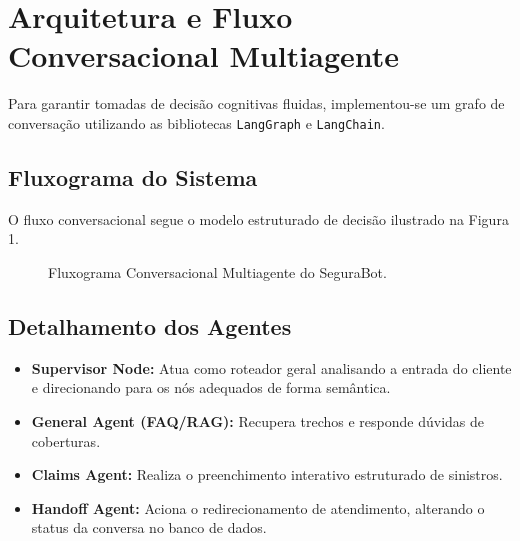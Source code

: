 \documentclass[12pt,a4paper]{article}
\begin{document}
\newpage

\section{Arquitetura e Fluxo Conversacional Multiagente}
Para garantir tomadas de decisão cognitivas fluidas, implementou-se um grafo de conversação utilizando as bibliotecas \texttt{LangGraph} e \texttt{LangChain}.

\subsection{Fluxograma do Sistema}
O fluxo conversacional segue o modelo estruturado de decisão ilustrado na Figura 1.

\begin{figure}[h]
\centering
{}
\caption{Fluxograma Conversacional Multiagente do SeguraBot.}
\label{fig:fluxograma}
\end{figure}

\subsection{Detalhamento dos Agentes}
\begin{itemize}
    \item \textbf{Supervisor Node:} Atua como roteador geral analisando a entrada do cliente e direcionando para os nós adequados de forma semântica.
    \item \textbf{General Agent (FAQ/RAG):} Recupera trechos e responde dúvidas de coberturas.
    \item \textbf{Claims Agent:} Realiza o preenchimento interativo estruturado de sinistros.
    \item \textbf{Handoff Agent:} Aciona o redirecionamento de atendimento, alterando o status da conversa no banco de dados.
\end{itemize}
\end{document}
